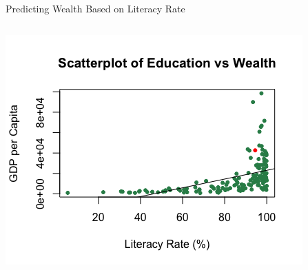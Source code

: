 \documentclass[xcolor=dvipsnames,aspectratio=169,t]{beamer}
\begin{document}
\begin{frame}{Predicting Wealth Based on Literacy Rate}
\begin{columns}[T]
  \column{0.33\tw}

  \vspace{-0.15in}

  \begin{center}
  \includegraphics[width=0.97\tw]{images/fig-edu-gdp.png}
  \end{center}

  \end{columns}
\end{frame}
\end{document}
